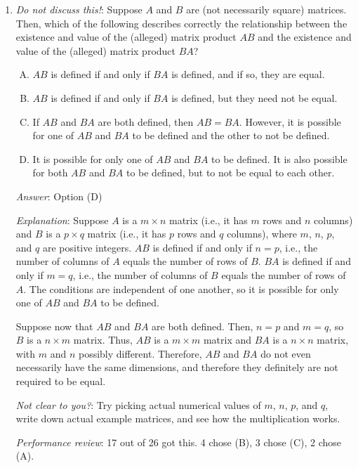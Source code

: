 \documentclass[10pt]{amsart}
\begin{document}
\begin{enumerate}
\item {\em Do not discuss this!}: Suppose $A$ and $B$ are (not
  necessarily square) matrices. Then, which of the following describes
  correctly the relationship between the existence and value of the
  (alleged) matrix product $AB$ and the existence and value of the
  (alleged) matrix product $BA$?

  \begin{enumerate}[(A)]
  \item $AB$ is defined if and only if $BA$ is defined, and if so,
    they are equal.
  \item $AB$ is defined if and only if $BA$ is defined, but they need
    not be equal.
  \item If $AB$ and $BA$ are both defined, then $AB = BA$. However, it
    is possible for one of $AB$ and $BA$ to be defined and the other
    to not be defined.
  \item It is possible for only one of $AB$ and $BA$ to be defined. It
    is also possible for both $AB$ and $BA$ to be defined, but to not
    be equal to each other.
  \end{enumerate}

  {\em Answer}: Option (D)

  {\em Explanation}: Suppose $A$ is a $m \times n$ matrix (i.e., it
  has $m$ rows and $n$ columns) and $B$ is a $p \times q$ matrix
  (i.e., it has $p$ rows and $q$ columns), where $m$, $n$, $p$, and
  $q$ are positive integers. $AB$ is defined if and only if $n = p$,
  i.e., the number of columns of $A$ equals the number of rows of
  $B$. $BA$ is defined if and only if $m = q$, i.e., the number of
  columns of $B$ equals the number of rows of $A$. The conditions are
  independent of one another, so it is possible for only one of $AB$
  and $BA$ to be defined.

  Suppose now that $AB$ and $BA$ are both defined. Then, $n = p$ and
  $m = q$, so $B$ is a $n \times m$ matrix. Thus, $AB$ is a $m \times
  m$ matrix and $BA$ is a $n \times n$ matrix, with $m$ and $n$
  possibly different. Therefore, $AB$ and $BA$ do not even necessarily
  have the same dimensions, and therefore they definitely are not
  required to be equal.

  {\em Not clear to you?}: Try picking actual numerical values of $m$,
  $n$, $p$, and $q$, write down actual example matrices, and see how
  the multiplication works.

  {\em Performance review}: 17 out of 26 got this. 4 chose (B), 3
  chose (C), 2 chose (A).


\end{enumerate}
\end{document}
